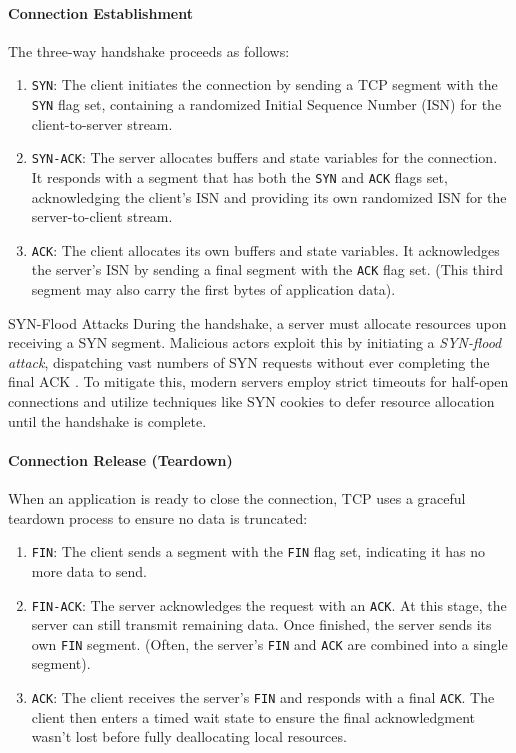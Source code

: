 \paragraph{Connection Establishment}
The three-way handshake proceeds as follows:
\begin{enumerate}
    \item \texttt{SYN}: The client initiates the connection by sending a TCP segment with the \texttt{SYN} flag set, containing a randomized Initial Sequence Number (ISN) for the client-to-server stream.
    \item \texttt{SYN-ACK}: The server allocates buffers and state variables for the connection. It responds with a segment that has both the \texttt{SYN} and \texttt{ACK} flags set, acknowledging the client's ISN and providing its own randomized ISN for the server-to-client stream.
    \item \texttt{ACK}: The client allocates its own buffers and state variables. It acknowledges the server's ISN by sending a final segment with the \texttt{ACK} flag set. (This third segment may also carry the first bytes of application data).
\end{enumerate}

\begin{note}{SYN-Flood Attacks}
During the handshake, a server must allocate resources upon receiving a SYN segment. Malicious actors exploit this by initiating a \emph{SYN-flood attack}, dispatching vast numbers of SYN requests without ever completing the final ACK \cite{rfc4987}. To mitigate this, modern servers employ strict timeouts for half-open connections and utilize techniques like SYN cookies to defer resource allocation until the handshake is complete.
\end{note}

\paragraph{Connection Release (Teardown)}
When an application is ready to close the connection, TCP uses a graceful teardown process to ensure no data is truncated:
\begin{enumerate}
    \item \texttt{FIN}: The client sends a segment with the \texttt{FIN} flag set, indicating it has no more data to send.
    \item \texttt{FIN-ACK}: The server acknowledges the request with an \texttt{ACK}. At this stage, the server can still transmit remaining data. Once finished, the server sends its own \texttt{FIN} segment. (Often, the server's \texttt{FIN} and \texttt{ACK} are combined into a single segment).
    \item \texttt{ACK}: The client receives the server's \texttt{FIN} and responds with a final \texttt{ACK}. The client then enters a timed wait state to ensure the final acknowledgment wasn't lost before fully deallocating local resources.
\end{enumerate}

